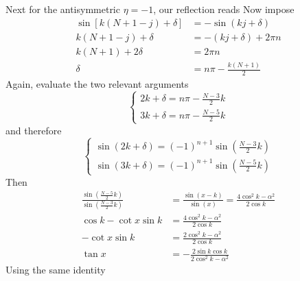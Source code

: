 \documentclass[../../../main.tex]{subfiles}
\begin{document}
Next for the antisymmetric $\eta=-1$, our reflection reads
Now impose
\begin{align*}
  \sin\left[k(N+1-j)+\delta\right] & =  -\sin(kj+\delta)      \\
  k(N+1-j)+\delta                  & =  -(kj+\delta)+2\pi n   \\
  k(N+1)+2\delta                   & =  2\pi n                \\
  \delta                           & =  n\pi-\frac{k(N+1)}{2}
\end{align*}
Again, evaluate the two relevant arguments
\begin{equation*}
  \begin{cases}
    2k+\delta = n\pi-\frac{N-3}{2}k \\
    3k+\delta = n\pi-\frac{N-5}{2}k
  \end{cases}
\end{equation*}
and therefore
\begin{equation*}
  \begin{cases}
    \sin(2k+\delta) = (-1)^{n+1} \sin\left(\frac{N-3}{2}k\right) \\
    \sin(3k+\delta) = (-1)^{n+1} \sin\left(\frac{N-5}{2}k\right)
  \end{cases}
\end{equation*}
Then
\begin{align*}
  \frac{ \sin\left(\frac{N-5}{2}k\right) }{ \sin\left(\frac{N-3}{2}k\right)} & =  \frac{\sin(x-k)}{\sin(x)} = \frac{4\cos^2k-\alpha^2}{2\cos k} \\
  \cos k-\cot x\sin k                                                        & =  \frac{4\cos^2k-\alpha^2}{2\cos k}                             \\
  -\cot x\sin k                                                              & =  \frac{2\cos^2k-\alpha^2}{2\cos k}                             \\
  \tan x                                                                     & =  -\frac{2\sin k\cos k} {2\cos^2k-\alpha^2}
\end{align*}
Using the same identity
\end{document}
